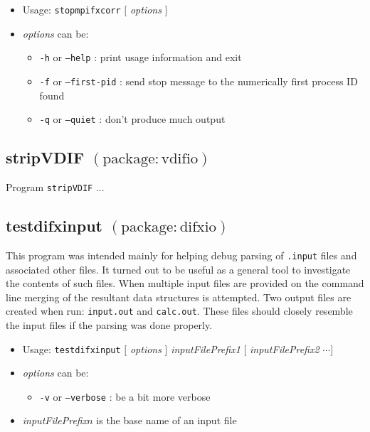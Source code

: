 \begin{itemize}
\item[] Usage: {\tt stopmpifxcorr} $[$ {\em options} $]$
\item[] {\em options} can be:
\begin{itemize}
\item[] {\tt -h} or {\tt --help} : print usage information and exit
\item[] {\tt -f} or {\tt --first-pid} : send stop message to the numerically first process ID found
\item[] {\tt -q} or {\tt --quiet} : don't produce much output
\end{itemize}
\end{itemize}










\subsection{stripVDIF {\small $\mathrm{(package: vdifio)}$} \label{sec:stripVDIF}}

Program {\tt stripVDIF} ...








\subsection{testdifxinput {\small $\mathrm{(package: difxio)}$}} \label{sec:testdifxinput}

This program was intended mainly for helping debug parsing of {\tt .input} files and associated other files.
It turned out to be useful as a general tool to investigate the contents of such files.
When multiple input files are provided on the command line merging of the resultant data structures is attempted.
Two output files are created when run: {\tt input.out} and {\tt calc.out}.
These files should closely resemble the input files if the parsing was done properly.

\begin{itemize}
\item[] Usage: {\tt testdifxinput} $[$ {\em options} $]$ {\em inputFilePrefix1} $[$ {\em inputFilePrefix2} $ \cdots ]$
\item[] {\em options} can be:
\begin{itemize}
\item[] {\tt -v} or {\tt --verbose} : be a bit more verbose
\end{itemize}
\item[] {\em inputFilePrefix}$n$ is the base name of an input file
\end{itemize}

